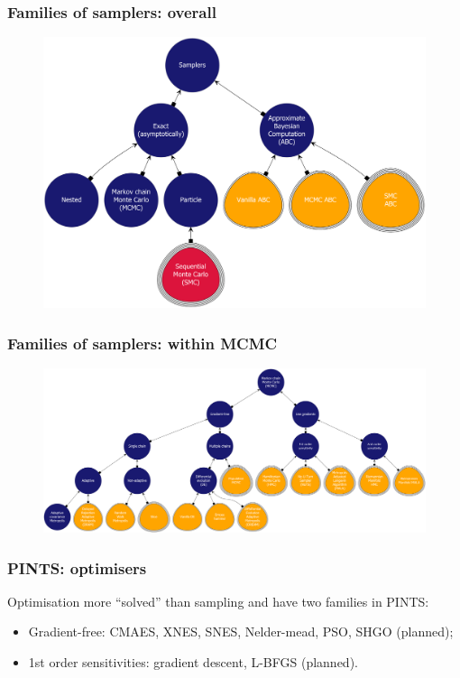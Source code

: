 \documentclass[handout]{beamer}
\begin{document}
\begin{frame}
	\frametitle{Families of samplers: overall}
	
	\begin{figure}
		\centerline{\includegraphics[width=1\textwidth]{./Figures/hierarchy-samplers-top.pdf}}
	\end{figure}
	
\end{frame}

\begin{frame}
	\frametitle{Families of samplers: within MCMC}
	
	\begin{figure}
		\centerline{\includegraphics[width=1\textwidth]{./Figures/hierarchy-samplers-mcmc.pdf}}
	\end{figure}
	
\end{frame}

\begin{frame}
	\frametitle{PINTS: optimisers}
	
	Optimisation more ``solved'' than sampling and have two families in PINTS:
	
	\begin{itemize}
		\item Gradient-free: CMAES, XNES, SNES, Nelder-mead, PSO, SHGO (planned);
		\item 1st order sensitivities: gradient descent, L-BFGS (planned).
	\end{itemize}
	
\end{frame}
\end{document}
